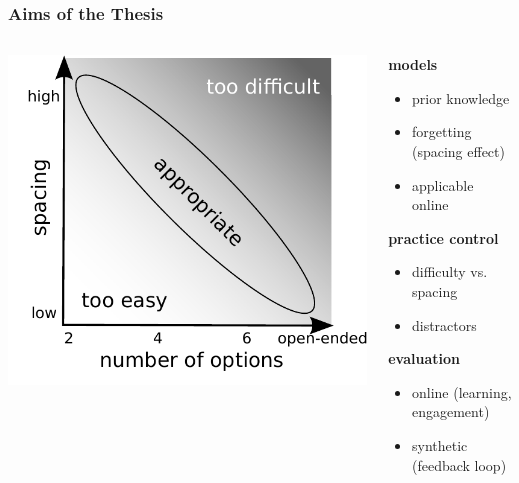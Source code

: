\documentclass[xcolor=svgnames]{beamer}
\begin{document}
\begin{frame}
	\frametitle{Aims of the Thesis}
	\begin{columns}[onlytextwidth]
		\begin{column}{0.4\textwidth}
			\includegraphics[width=1\textwidth]{figure/options_vs_spacing}
		\end{column}
		\begin{column}{0.55\textwidth}
			\textbf{models}
			\begin{itemize}
				\item prior knowledge
				\item forgetting (spacing effect)
				\item applicable online
			\end{itemize}
			\textbf{practice control}
			\begin{itemize}
				\item difficulty vs. spacing
				\item distractors
			\end{itemize}
			\textbf{evaluation}
			\begin{itemize}
				\item online (learning, engagement)
				\item synthetic (feedback loop)
			\end{itemize}
		\end{column}
	\end{columns}
\end{frame}
\end{document}
